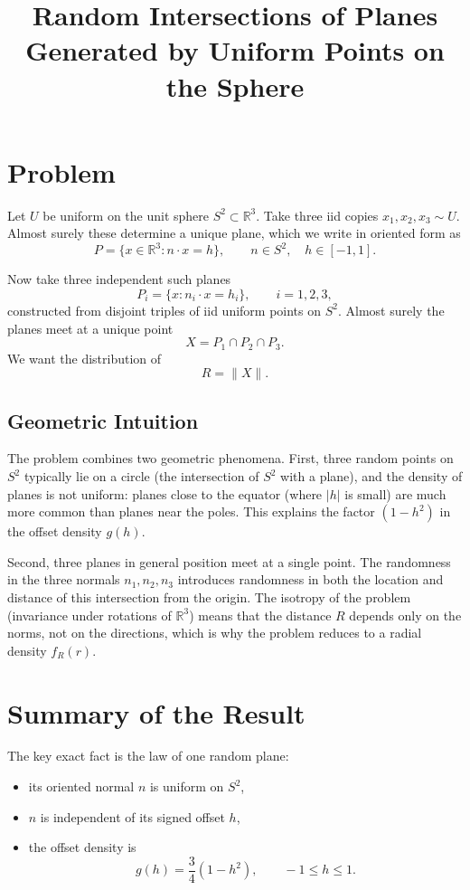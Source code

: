 \documentclass[11pt]{article}
\title{Random Intersections of Planes Generated by Uniform Points on the Sphere}
\author{}
\date{}
\begin{document}
\maketitle

\section*{Problem}

Let $U$ be uniform on the unit sphere $S^2 \subset \mathbb{R}^3$. Take three iid copies
$x_1,x_2,x_3 \sim U$. Almost surely these determine a unique plane, which we write in oriented
form as
\[
P = \{x \in \mathbb{R}^3 : n \cdot x = h\},
\qquad n \in S^2,\quad h \in [-1,1].
\]

Now take three independent such planes
\[
P_i = \{x : n_i \cdot x = h_i\}, \qquad i=1,2,3,
\]
constructed from disjoint triples of iid uniform points on $S^2$. Almost surely the planes meet at
a unique point
\[
X = P_1 \cap P_2 \cap P_3.
\]
We want the distribution of
\[
R = \|X\|.
\]

\subsection*{Geometric Intuition}

The problem combines two geometric phenomena. First, three random points on $S^2$ typically lie on
a circle (the intersection of $S^2$ with a plane), and the density of planes is not uniform: planes
close to the equator (where $|h|$ is small) are much more common than planes near the poles. This
explains the factor $(1-h^2)$ in the offset density $g(h)$.

Second, three planes in general position meet at a single point. The randomness in the three normals
$n_1, n_2, n_3$ introduces randomness in both the location and distance of this intersection from
the origin. The isotropy of the problem (invariance under rotations of $\mathbb{R}^3$) means that
the distance $R$ depends only on the norms, not on the directions, which is why the problem reduces
to a radial density $f_R(r)$.

\section*{Summary of the Result}

The key exact fact is the law of one random plane:

\begin{itemize}
\item its oriented normal $n$ is uniform on $S^2$,
\item $n$ is independent of its signed offset $h$,
\item the offset density is
\[
g(h) = \frac{3}{4}(1-h^2), \qquad -1 \le h \le 1.
\]
\end{itemize}
\end{document}
